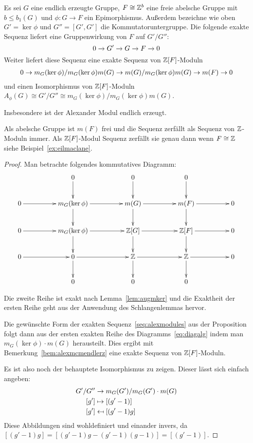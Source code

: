 \begin{prop}
\label{prop:alexmodules}
	Es sei $G$ eine endlich erzeugte Gruppe, $F \cong \mathbb{Z}^b$ eine freie abelsche Gruppe mit $b\leq b_1(G)$ und $\phi: G \to F$ ein Epimorphismus. Außerdem bezeichne wie oben $G'=\ker\phi$ und $G''=[G',G']$ die Kommutatoruntergruppe. Die folgende exakte Sequenz liefert eine Gruppenwirkung von $F$ auf $G'/G''$:
	\[
		0\to G'\to G\to F\to0
	\]
	Weiter liefert diese Sequenz eine exakte Sequenz von $\mathbb{Z}[F]$-Moduln
		\begin{align}
		0\to m_G(\ker\phi)/m_G(\ker\phi)m(G)\to m(G)/m_G(\ker\phi)m(G)\to m(F)\to0 \label{seq:alexmodules}
		\end{align}
		und einen Isomorphismus von $\mathbb{Z}[F]$-Moduln $A_\phi(G) \cong G'/G'' \cong m_G(\ker\phi)/m_G(\ker\phi)m(G)$.

	Insbesondere ist der Alexander Modul endlich erzeugt.
\end{prop}
\begin{bem}
	Als abelsche Gruppe ist $m(F)$ frei und die Sequenz zerfällt als Sequenz von $\mathbb{Z}$-Moduln immer. Als $\mathbb{Z}[F]$-Modul Sequenz zerfällt sie genau dann wenn $F\cong \mathbb{Z}$ siehe Beispiel~\ref{ex:eilmaclane}.
\end{bem}
\begin{proof}
		Man betrachte folgendes kommutatives Diagramm:	
		\begin{equation}
		\label{eq:diagalg}
			\begin{xy}
				\xymatrixcolsep{4pc}\xymatrix{	
									& 0 \ar[d] & 0\ar[d] & 0\ar[d]&\\
							0 \ar[r]&	m_G(\ker\phi) \ar[r] \ar[d]&	m(G) \ar[r] \ar[d]& m(F) \ar[r] \ar[d]&	0\\
							0 \ar[r]&	m_G(\ker\phi) \ar[r] \ar[d]&	\ZZ[G] \ar[r] \ar[d]& \ZZ[F] \ar[r] \ar[d]&	0\\
							0 \ar[r]&		0	\ar[d]\ar[r] 	&	\ZZ \ar[d] \ar[r]	&	\ZZ \ar[r] \ar[d] &		0\\
							&0&0&0&}
			\end{xy}
		\end{equation}

		Die zweite Reihe ist exakt nach Lemma~\ref{lem:augmker} und die Exaktheit der ersten Reihe geht aus der Anwendung des Schlangenlemmas hervor.

		Die gewünschte Form der exakten Sequenz~\eqref{seq:alexmodules} aus der Proposition folgt dann aus der ersten exakten Reihe des Diagramms~\eqref{eq:diagalg} indem man $m_G(\ker\phi)\cdot m(G)$ herausteilt. Dies ergibt mit Bemerkung~\ref{bem:alexmcmendlerz} eine exakte Sequenz von $\mathbb{Z}[F]$-Moduln.

		Es ist also noch der behauptete Isomorphismus zu zeigen. Dieser lässt sich einfach angeben:
		\begin{align*}
			G'/G'' 	&\to 		m_G(G')/m_G(G')\cdot m(G)\\
			[g']		&\mapsto	[(g'-1)]\\
			[g']		&\mathrel{\reflectbox{\ensuremath{\mapsto}}}  [(g'-1)g]
		\end{align*}
		Diese Abbildungen sind wohldefiniert und einander invers, da $[(g'-1)g]=[(g'-1)g-(g'-1)(g-1)]=[(g'-1)]$.
	\end{proof}	
